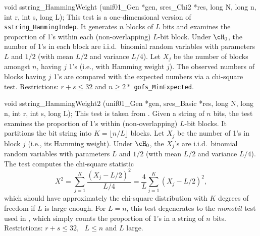 void sstring_HammingWeight (unif01_Gen *gen, sres_Chi2 *res,
                            long N, long n, int r, int s, long L);
\endcode
 \tab
  This test is a one-dimensional version of {\tt sstring\_HammingIndep}.
  It generates $n$ blocks of $L$ bits and examines the proportion of 1's
  within each  (non-overlapping) $L$-bit block.
  Under $\cH_0$, the number of 1's in each block are
  i.i.d.\ binomial random variables 
  with parameters $L$ and $1/2$ (with mean $L/2$ and variance $L/4$).
  Let $X_j$ be the number of blocks amongst $n$, having $j$ 1's 
  (i.e., with Hamming weight $j$).
  The observed numbers of blocks having $j$ 1's are compared
  with the expected numbers via a chi-square test.
  Restrictions: $r + s \le 32$ and $n \ge 2*$ {\tt gofs\_MinExpected}.
 \endtab
\code


void sstring_HammingWeight2 (unif01_Gen *gen, sres_Basic *res,
                             long N, long n, int r, int s, long L);
\endcode
 \tab
{}
  This test is taken from  \cite{rRUK01a}.
  Given a string of $n$ bits, the test examines the proportion of 1's
  within (non-overlapping) $L$-bit blocks. It partitions the bit string into 
  $K = \lfloor n/L \rfloor$  blocks.
  Let $X_j$ be the number of 1's in block $j$ (i.e., its Hamming weight).
  Under $\cH_0$, the $X_j$'s are i.i.d.\ binomial random variables 
  with parameters $L$ and $1/2$ (with mean $L/2$ and variance $L/4$).
  The test computes the chi-square statistic
$$
   X^2 = \sum_{j=1}^K \frac{(X_j - L/2)^2}{L/4}
       = \frac{4}{L} \sum_{j=1}^K (X_j - L/2)^2,
$$
  which should have approximately the chi-square distribution with $K$ 
  degrees of freedom if $L$ is large enough.
  For $L=n$, this test degenerates to the {\em monobit\/} test 
  used in \cite{rRUK01a}, which simply counts the proportion of 1's 
  in a string of $n$ bits.
  Restrictions: $r + s \le 32$, \ $ L \le n$ and  $L$ large.
 \endtab
\code


